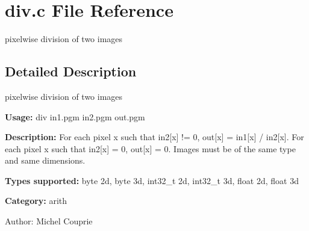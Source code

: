 \section{div.c File Reference}
\label{div_8c}
pixelwise division of two images  




\label{_details}
\subsection{Detailed Description}
pixelwise division of two images 

{\bf Usage:} div in1.pgm in2.pgm out.pgm

{\bf Description:} For each pixel x such that in2[x] != 0, out[x] = in1[x] / in2[x]. For each pixel x such that in2[x] = 0, out[x] = 0. Images must be of the same type and same dimensions.

{\bf Types supported:} byte 2d, byte 3d, int32\_\-t 2d, int32\_\-t 3d, float 2d, float 3d

{\bf Category:} arith

\begin{Desc}
\item[Author:]Michel Couprie \end{Desc}
